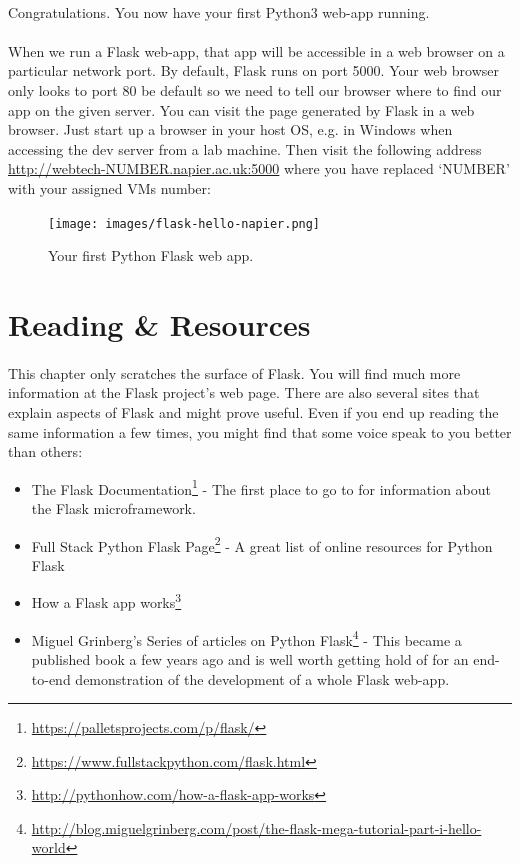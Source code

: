 \documentclass[12pt, a4paper, oneside]{book}
\begin{document}
\paragraph{} Congratulations. You now have your first Python3 web-app running. 

\paragraph{} When we run a Flask web-app, that app will be accessible in a web browser on a particular network port. By default, Flask runs on port 5000. Your web browser only looks to port 80 be default so we need to tell our browser where to find our app on the given server. You can visit the page generated by Flask in a web browser. Just start up a browser in your host OS, e.g. in Windows when accessing the dev server from a lab machine. Then visit the following address \url{http://webtech-NUMBER.napier.ac.uk:5000} where you have replaced `NUMBER' with your assigned VMs number:

\begin{figure}[H]
\centering
\texttt{[image: images/flask-hello-napier.png]}
\caption{Your first Python Flask web app.}
\label{fig:flask-hello-napier}
\end{figure}


\section{Reading \& Resources}
\paragraph{} This chapter only scratches the surface of Flask. You will find much more information at the Flask project's web page. There are also several sites that explain aspects of Flask and might prove useful. Even if you end up reading the same information a few times, you might find that some voice speak to you better than others:

\begin{itemize}
\item The Flask Documentation\footnote{\url{https://palletsprojects.com/p/flask/}} - The first place to go to for information about the Flask microframework.
\item Full Stack Python Flask Page\footnote{\url{https://www.fullstackpython.com/flask.html}} - A great list of online resources for Python Flask
\item How a Flask app works\footnote{\url{http://pythonhow.com/how-a-flask-app-works}}
\item Miguel Grinberg's Series of articles on Python Flask\footnote{\url{http://blog.miguelgrinberg.com/post/the-flask-mega-tutorial-part-i-hello-world}} - This became a published book a few years ago and is well worth getting hold of for an end-to-end demonstration of the development of a whole Flask web-app. 
\end{itemize}
\end{document}
